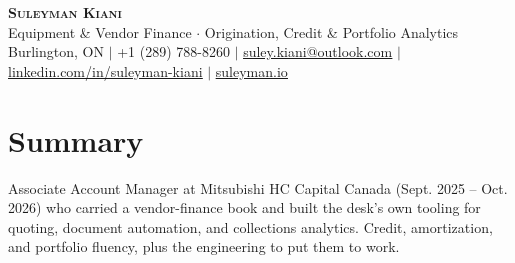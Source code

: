 \documentclass[letterpaper,11pt]{article}
\begin{document}
\begin{center}
    \textbf{\Huge \scshape Suleyman Kiani} \\ \vspace{3pt}
    \small Equipment \& Vendor Finance $\cdot$ Origination, Credit \& Portfolio Analytics \\ \vspace{3pt}
    \small Burlington, ON $|$ +1 (289) 788-8260 $|$ \href{mailto:suley.kiani@outlook.com}{\underline{suley.kiani@outlook.com}} $|$ \href{https://www.linkedin.com/in/suleyman-kiani}{\underline{linkedin.com/in/suleyman-kiani}} $|$ \href{https://suleyman.io}{\underline{suleyman.io}}
\end{center}

\section{Summary}
\vspace{2pt}
\small{Associate Account Manager at Mitsubishi HC Capital Canada (Sept. 2025 -- Oct. 2026) who carried a vendor-finance book and built the desk's own tooling for quoting, document automation, and collections analytics. Credit, amortization, and portfolio fluency, plus the engineering to put them to work.}
\vspace{-4pt}

\end{document}
